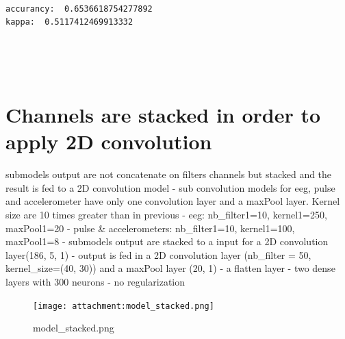 \documentclass[11pt]{article}
\begin{document}
    \begin{center}
    \end{center}
    { \hspace*{\fill} \\}
    
    \begin{Verbatim}[commandchars=\\\{\}]
accurancy:  0.6536618754277892
kappa:  0.5117412469913332

    \end{Verbatim}

    \begin{center}
    \end{center}
    { \hspace*{\fill} \\}
    
    \begin{center}
    \end{center}
    { \hspace*{\fill} \\}
    
    \section{Channels are stacked in order to apply 2D
convolution}\label{channels-are-stacked-in-order-to-apply-2d-convolution}

submodels output are not concatenate on filters channels but stacked and
the result is fed to a 2D convolution model - sub convolution models for
eeg, pulse and accelerometer have only one convolution layer and a
maxPool layer. Kernel size are 10 times greater than in previous - eeg:
nb\_filter1=10, kernel1=250, maxPool1=20 - pulse \& accelerometers:
nb\_filter1=10, kernel1=100, maxPool1=8 - submodels output are stacked
to a input for a 2D convolution layer(186, 5, 1) - output is fed in a 2D
convolution layer (nb\_filter = 50, kernel\_size=(40, 30)) and a maxPool
layer (20, 1) - a flatten layer - two dense layers with 300 neurons - no
regularization

\begin{figure}
\centering
\texttt{[image: attachment:model\_stacked.png]}
\caption{model\_stacked.png}
\end{figure}
\end{document}
